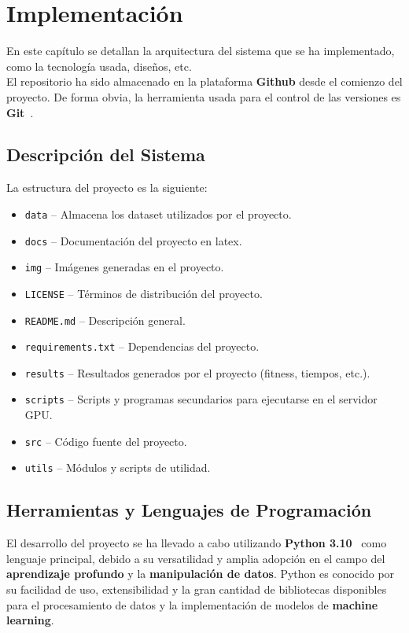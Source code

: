 \chapter{Implementación}\label{ch:implementacion}
En este capítulo se detallan la arquitectura del sistema que se ha implementado, como la tecnología usada, diseños, etc.
\\[6pt]

El repositorio ha sido almacenado en la plataforma \textbf{Github} desde el comienzo del proyecto.
De forma obvia, la herramienta usada para el control de las versiones es \textbf{Git}~\cite{}. \\[6pt]

\section{Descripción del Sistema}\label{sec:descripcion_del_sistema}
La estructura del proyecto es la siguiente:
\begin{itemize}
    \item \texttt{data} -- Almacena los dataset utilizados por el proyecto.
    \item \texttt{docs} -- Documentación del proyecto en latex.
    \item \texttt{img} -- Imágenes generadas en el proyecto.
    \item \texttt{LICENSE} -- Términos de distribución del proyecto.
    \item \texttt{README.md} -- Descripción general.
    \item \texttt{requirements.txt} -- Dependencias del proyecto.
    \item \texttt{results} -- Resultados generados por el proyecto (fitness, tiempos, etc.).
    \item \texttt{scripts} -- Scripts y programas secundarios para ejecutarse en el servidor GPU\@.
    \item \texttt{src} -- Código fuente del proyecto.
    \item \texttt{utils} -- Módulos y scripts de utilidad.
\end{itemize}

\section{Herramientas y Lenguajes de Programación}\label{sec:herramientas_y_lenguajes_de_programacion}
El desarrollo del proyecto se ha llevado a cabo utilizando \textbf{Python 3.10}~\cite{} como lenguaje principal,
debido a su versatilidad y amplia adopción en el campo del \textbf{aprendizaje profundo} y la
\textbf{manipulación de datos}.
Python es conocido por su facilidad de uso, extensibilidad y la gran cantidad de bibliotecas disponibles para el
procesamiento de datos y la implementación de modelos de \textbf{machine learning}. \\[6pt]

